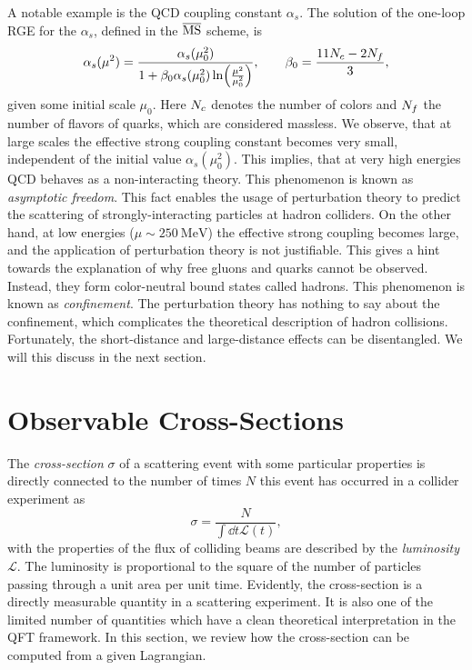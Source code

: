 A notable example is the QCD coupling constant $\alpha_s$.
The solution of the one-loop RGE for the $\alpha_s$, defined in the $\overline{\text{MS}}$ scheme, is
\begin{align}
  \alpha_s(\mu^2)=\frac{\alpha_s(\mu_0^2)}{1+\beta_0 \alpha_s(\mu_0^2)\ln(\frac{\mu^2}{\mu_0^2})}, \qquad \beta_0=\frac{11 {N_c}-2{N_f}}{3},
\end{align}
given some initial scale $\mu_0$.  
Here ${N_c}$ denotes the number of colors and ${N_f}$ the number of flavors of quarks, which are considered massless.
We observe, that at large scales the effective strong coupling constant becomes very small, independent of the initial value $\alpha_s(\mu_0^2)$.
This implies, that at very high energies QCD behaves as a non-interacting theory. This phenomenon is known as \emph{asymptotic freedom}.
This fact enables the usage of perturbation theory to predict the scattering of strongly-interacting particles at hadron colliders.
On the other hand, at low energies ($\mu \sim 250~\text{MeV}$) the effective strong coupling becomes large, and the application of perturbation theory is not justifiable.
This gives a hint towards the explanation of why free gluons and quarks cannot be observed.
Instead, they form color-neutral bound states called hadrons.
This phenomenon is known as \emph{confinement}. 
The perturbation theory has nothing to say about the confinement, which
complicates the theoretical description of hadron collisions.
Fortunately, the short-distance and large-distance effects can be disentangled.
We will this discuss in the next section.


\section{Observable Cross-Sections}
\label{sec:hadcoll}

The \emph{cross-section} $\sigma$ of a scattering event with some particular properties
is directly connected to the number of times $N$ this event has occurred in a collider experiment as
\begin{equation}
\sigma  = \frac{N}{ \int \dd{t} \mathcal{L}(t)},
\end{equation}
with the properties of the flux of colliding beams are described by the \emph{luminosity} $\mathcal{L}$.
The luminosity is proportional to the square of the number of particles passing through a unit area per unit time.
Evidently, the cross-section is a directly measurable quantity in a scattering experiment.
It is also one of the limited number of quantities which have a clean theoretical interpretation in the QFT framework.
In this section, we review how the cross-section can be computed from a given Lagrangian.


